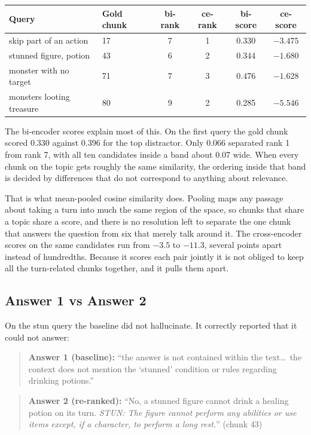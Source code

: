\documentclass[11pt,a4paper]{article}
\begin{document}
\begin{tabular}{llcccc}
\toprule
Query & Gold chunk & bi-rank & ce-rank & bi-score & ce-score \\
\midrule
skip part of an action      & 17 & 7 & 1 & 0.330 & $-3.475$ \\
stunned figure, potion      & 43 & 6 & 2 & 0.344 & $-1.680$ \\
monster with no target      & 71 & 7 & 3 & 0.476 & $-1.628$ \\
monsters looting treasure   & 80 & 9 & 2 & 0.285 & $-5.546$ \\
\bottomrule
\end{tabular}

\medskip
The bi-encoder scores explain most of this. On the first query the gold chunk scored
0.330 against 0.396 for the top distractor. Only 0.066 separated rank 1 from rank 7, with all
ten candidates inside a band about 0.07 wide. When every chunk on the topic gets roughly the
same similarity, the ordering inside that band is decided by differences that do not
correspond to anything about relevance.

That is what mean-pooled cosine similarity does. Pooling maps any passage about taking a
turn into much the same region of the space, so chunks that share a topic share a score, and
there is no resolution left to separate the one chunk that answers the question from six that
merely talk around it. The cross-encoder scores on the same candidates run from $-3.5$ to
$-11.3$, several points apart instead of hundredths. Because it scores each pair jointly it
is not obliged to keep all the turn-related chunks together, and it pulls them apart.

\subsection{Answer 1 vs Answer 2}

On the stun query the baseline did not hallucinate. It correctly reported that it could not
answer:

\begin{quote}
\textbf{Answer 1 (baseline):} ``the answer is not contained within the text\ldots\ the
context does not mention the `stunned' condition or rules regarding drinking potions.''
\end{quote}

\begin{quote}
\textbf{Answer 2 (re-ranked):} ``No, a stunned figure cannot drink a healing potion on
its turn. \emph{STUN: The figure cannot perform any abilities or use items except, if a
character, to perform a long rest.}'' (chunk 43)
\end{quote}
\end{document}
